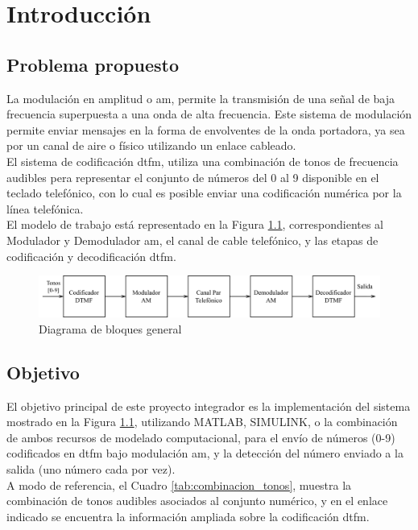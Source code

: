 \chapter{Introducción}
\section{Problema propuesto}
La modulación en amplitud o \gls{am}, permite la transmisión de una señal de baja frecuencia superpuesta a una onda de alta frecuencia. Este sistema de modulación permite enviar mensajes en la forma de envolventes de la onda portadora, ya sea por un canal de aire o físico utilizando un enlace cableado.\\
El sistema de codificación \gls{dtfm}, utiliza una combinación de tonos de frecuencia audibles pera representar el conjunto de números del 0 al 9 disponible en el teclado telefónico, con lo cual es posible enviar una codificación numérica por la línea telefónica.\\
El modelo de trabajo está representado en la Figura \ref{fig:intro_diagrama_bloques}, correspondientes al Modulador y Demodulador \gls{am}, el canal de cable telefónico, y las etapas de codificación y decodificación \gls{dtfm}.

\begin{figure}[ht]
  \centering
  \includegraphics[width=\linewidth]{images/diagramas-bloques.png}
  \caption{Diagrama de bloques general}
  \label{fig:intro_diagrama_bloques}
\end{figure}

\section{Objetivo}
El objetivo principal de este proyecto integrador es la implementación del sistema mostrado en la Figura \ref{fig:intro_diagrama_bloques}, utilizando MATLAB, SIMULINK, o la combinación de ambos recursos de modelado computacional, para el envío de números (0-9) codificados en \gls{dtfm} bajo modulación \gls{am}, y la detección del número enviado a la salida (uno número cada por vez).\\
A modo de referencia, el Cuadro \ref{tab:combinacion_tonos}, muestra la combinación de tonos audibles asociados al conjunto numérico, y en el enlace indicado se encuentra la información ampliada sobre la codificación \gls{dtfm}.

